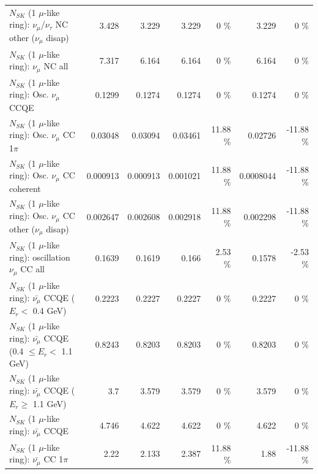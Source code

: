 \begin{table}
\begin{tabular}{| l | r | r | r  r | r  r |}
   $N_{SK}$ (1 $\mu$-like ring): $\nu_\mu$/$\nu_\tau$ NC other ($\nu_\mu$ disap) &           3.428 &           3.229 &           3.229 &        0 \%  &           3.229 &        0 \%  \\ 
                                $N_{SK}$ (1 $\mu$-like ring): $\nu_{\mu}$ NC all &           7.317 &           6.164 &           6.164 &        0 \%  &           6.164 &        0 \%  \\ 
\hline
\hline
                               $N_{SK}$ (1 $\mu$-like ring): Osc. $\nu_\mu$ CCQE &          0.1299 &          0.1274 &          0.1274 &        0 \%  &          0.1274 &        0 \%  \\ 
                          $N_{SK}$ (1 $\mu$-like ring): Osc. $\nu_\mu$ CC 1$\pi$ &         0.03048 &         0.03094 &         0.03461 &    11.88 \%  &         0.02726 &   -11.88 \%  \\ 
                        $N_{SK}$ (1 $\mu$-like ring): Osc. $\nu_\mu$ CC coherent &        0.000913 &        0.000913 &        0.001021 &    11.88 \%  &       0.0008044 &   -11.88 \%  \\ 
         $N_{SK}$ (1 $\mu$-like ring): Osc. $\nu_\mu$ CC other ($\nu_\mu$ disap) &        0.002647 &        0.002608 &        0.002918 &    11.88 \%  &        0.002298 &   -11.88 \%  \\ 
                      $N_{SK}$ (1 $\mu$-like ring): oscillation $\nu_\mu$ CC all &          0.1639 &          0.1619 &           0.166 &     2.53 \%  &          0.1578 &    -2.53 \%  \\ 
\hline
\hline
          $N_{SK}$ (1 $\mu$-like ring): $\bar{\nu_\mu}$ CCQE ($E_{r} <$ 0.4 GeV) &          0.2223 &          0.2227 &          0.2227 &        0 \%  &          0.2227 &        0 \%  \\ 
 $N_{SK}$ (1 $\mu$-like ring): $\bar{\nu_\mu}$ CCQE (0.4 $\leq E_{r} <$ 1.1 GeV) &          0.8243 &          0.8203 &          0.8203 &        0 \%  &          0.8203 &        0 \%  \\ 
       $N_{SK}$ (1 $\mu$-like ring): $\bar{\nu_\mu}$ CCQE ($E_{r} \geq$ 1.1 GeV) &             3.7 &           3.579 &           3.579 &        0 \%  &           3.579 &        0 \%  \\ 
\hline
                              $N_{SK}$ (1 $\mu$-like ring): $\bar{\nu_\mu}$ CCQE &           4.746 &           4.622 &           4.622 &        0 \%  &           4.622 &        0 \%  \\ 
                         $N_{SK}$ (1 $\mu$-like ring): $\bar{\nu_\mu}$ CC 1$\pi$ &            2.22 &           2.133 &           2.387 &    11.88 \%  &            1.88 &   -11.88 \%  \\ 

\end{tabular}
\end{table}
